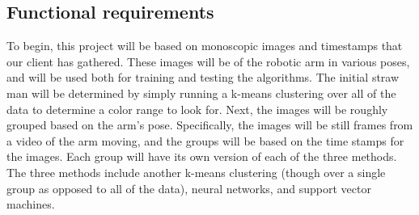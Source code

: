 \documentclass[10pt,journal,compsoc, draftclsnofoot,onecolumn]{IEEEtran}
\begin{document}
\subsection{Functional requirements}

To begin, this project will be based on monoscopic images and timestamps that our client has gathered.
These images will be of the robotic arm in various poses, and will be used both for training and testing the algorithms.
The initial straw man will be determined by simply running a k-means clustering over all of the data to determine a color range to look for.
Next, the images will be roughly grouped based on the arm's pose.
Specifically, the images will be still frames from a video of the arm moving, and the groups will be based on the time stamps for the images.
Each group will have its own version of each of the three methods.
The three methods include another k-means clustering (though over a single group as opposed to all of the data), neural networks, and support vector machines.
\end{document}
